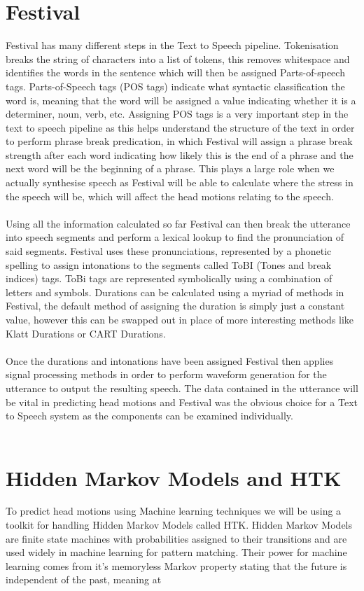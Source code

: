 \documentclass[bsc,frontabs,twoside,singlespacing,parskip]{infthesis}
\begin{document}
\section{Festival}
Festival has many different steps in the Text to Speech pipeline. Tokenisation breaks the string of characters into a list of tokens, this removes whitespace and identifies the words in the sentence which will then be assigned Parts-of-speech tags. Parts-of-Speech tags (POS tags) indicate what syntactic classification the word is, meaning that the word will be assigned a value indicating whether it is a determiner, noun, verb, etc. Assigning POS tags is a very important step in the text to speech pipeline as this helps understand the structure of the text in order to perform phrase break predication, in which Festival will assign a phrase break strength after each word indicating how likely this is the end of a phrase and the next word will be the beginning of a phrase. This plays a large role when we actually synthesise speech as Festival will be able to calculate where the stress in the speech will be, which will affect the head motions relating to the speech.
\\
\\
Using all the information calculated so far Festival can then break the utterance into speech segments and perform a lexical lookup to find the pronunciation of said segments. Festival uses these pronunciations, represented by a phonetic spelling to assign intonations to the segments called ToBI (Tones and break indices) tags. ToBi tags are represented symbolically using a combination of letters and symbols. Durations can be calculated using a myriad of methods in Festival, the default method of assigning the duration is simply just a constant value, however this can be swapped out in place of more interesting methods like Klatt Durations or CART Durations. 
\\
\\
Once the durations and intonations have been assigned Festival then applies signal processing methods in order to perform waveform generation for the utterance to output the resulting speech. The data contained in the utterance will be vital in predicting head motions and Festival was the obvious choice for a Text to Speech system as the components can be examined individually.
\\
\\
\section{Hidden Markov Models and HTK}
To predict head motions using Machine learning techniques we will be using a toolkit for handling Hidden Markov Models called HTK. Hidden Markov Models are finite state machines with probabilities assigned to their transitions and are used widely in machine learning for pattern matching. Their power for machine learning comes from it's memoryless Markov property stating that the future is independent of the past, meaning at
\\
\\
\end{document}

